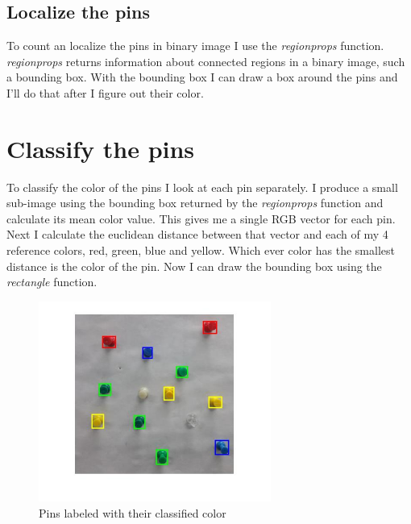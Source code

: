 \documentclass[12pt]{article}
\begin{document}
\subsection{Localize the pins}

To count an localize the pins in binary image I use the \textit{regionprops} function. \textit{regionprops} returns information about connected regions in a binary image, such a bounding box. With the bounding box I can draw a box around the pins and I'll do that after I figure out their color.


\section{Classify the pins}

To classify the color of the pins I look at each pin separately. I produce a small sub-image using the bounding box returned by the \textit{regionprops} function and calculate its mean color value. This gives me a single RGB vector for each pin. Next I calculate the euclidean distance between that vector and each of my 4 reference colors, red, green, blue and yellow. Which ever color has the smallest distance is the color of the pin. Now I can draw the bounding box using the \textit{rectangle} function.


\begin{figure}
    \centering
    \includegraphics[width=3.0in]{pins_box2}
    \caption{Pins labeled with their classified color}
    \label{fig_pins_box2}
\end{figure}
\end{document}
